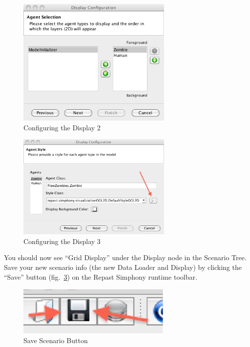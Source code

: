 \documentclass[11pt]{amsart}
\begin{document}
\begin{figure}[h]
\begin{center}
\vspace{.2in}
\centerline {
\includegraphics[width=3in]{figs/display2.png}
}
\caption{Configuring the Display 2}
\label{fig:disp2}
\end{center}
\end{figure}

\begin{figure}[h]
\begin{center}
\vspace{.2in}
\centerline {
\includegraphics[width=3in]{figs/display3.png}
}
\caption{Configuring the Display 3}
\label{fig:disp3}
\end{center}
\end{figure}

You should now see ``Grid Display'' under the Display node in the Scenario Tree. Save your new scenario info (the new Data Loader and Display) by clicking the ``Save'' button (fig.~\ref{fig:save_button}) on the Repast Simphony runtime toolbar.

\begin{figure}[h]
\begin{center}
\vspace{.2in}
\centerline {
\includegraphics[width=3in]{figs/save_button.eps}
}
\caption{Save Scenario Button}
\label{fig:save_button}
\end{center}
\end{figure}
\end{document}
